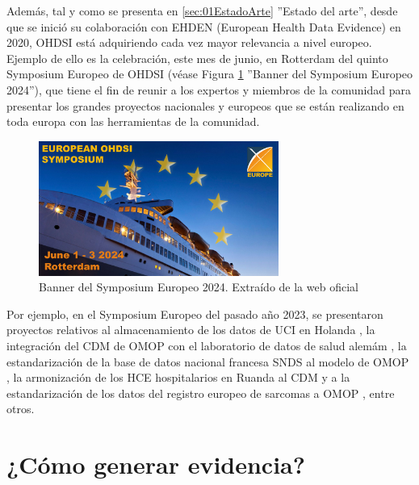 Además, tal y como se presenta en \ref{sec:01EstadoArte} ''Estado del arte'', desde que se inició su colaboración con EHDEN (European Health Data Evidence) en 2020, OHDSI está adquiriendo cada vez mayor relevancia a nivel europeo. Ejemplo de ello es la celebración, este mes de junio, en Rotterdam del quinto Symposium Europeo de OHDSI (véase Figura \ref{fig:bannerSymposyum2024} ''Banner del Symposium Europeo 2024''), que tiene el fin de reunir a los expertos y miembros de la comunidad para presentar los grandes proyectos nacionales y europeos que se están realizando en toda europa con las herramientas de la comunidad.

\begin{figure}[H]
    \centering
    \includegraphics[width=0.70\textwidth]{figures/bannerSymposyum2024.jpg}
     \caption{Banner del Symposium Europeo 2024. Extraído de la web oficial \cite{OHDSIwebsite}}
    \label{fig:bannerSymposyum2024}
\end{figure}

Por ejemplo, en el Symposium Europeo del pasado año 2023, se presentaron proyectos relativos al almacenamiento de los datos de UCI en Holanda \cite{Jagesar2023The}, la integración del CDM de OMOP con el laboratorio de datos de salud alemám \cite{Finster2023Integrating}, la estandarización de la base de datos nacional francesa SNDS al modelo de OMOP \cite{Collumeau2023Standardization}, la armonización de los HCE hospitalarios en Ruanda al CDM \cite{Halvorsen2023Ruanda} y a la estandarización de los datos del registro europeo de sarcomas a OMOP \cite{vanSwieten2023Standardizing}, entre otros.


\section{¿Cómo generar evidencia?} \label{sec:05Evidencia}

